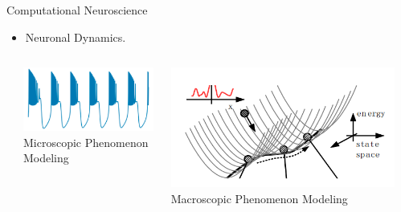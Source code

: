 \documentclass{beamer}
\begin{document}
\begin{frame}{Computational Neuroscience}
  \begin{itemize}
    \item Neuronal Dynamics.
  \end{itemize}
  \begin{columns}
    \begin{column}{.1\linewidth}\end{column}
    \begin{column}{.4\linewidth}
      \begin{center}
        \includegraphics[width=0.6\linewidth]{figs/neuro-dynamics.png}\\
        Microscopic Phenomenon Modeling
      \end{center}
    \end{column}
    \begin{column}{.4\linewidth}
      \begin{center}
        \includegraphics[width=0.6\linewidth]{figs/cann.png}\\
        Macroscopic Phenomenon Modeling
      \end{center}
    \end{column}
    \begin{column}{.1\linewidth}\end{column}
  \end{columns}
\end{frame}
\end{document}
